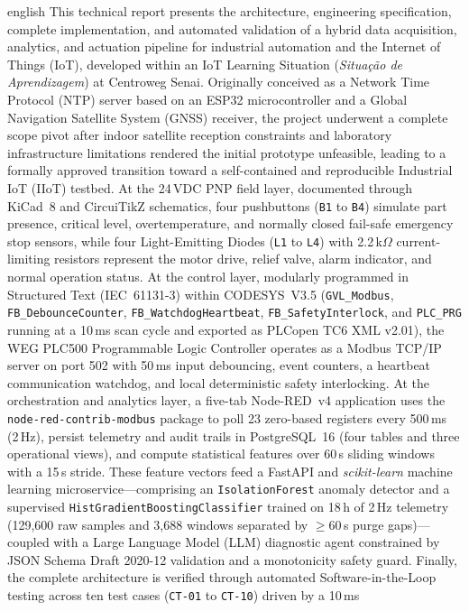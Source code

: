 
\begin{resumo}[Abstract]
\begin{otherlanguage*}{english}
This technical report presents the architecture, engineering specification, complete implementation, and automated validation of a hybrid data acquisition, analytics, and actuation pipeline for industrial automation and the Internet of Things (IoT), developed within an IoT Learning Situation (\textit{Situação de Aprendizagem}) at Centroweg Senai. Originally conceived as a Network Time Protocol (NTP) server based on an ESP32 microcontroller and a Global Navigation Satellite System (GNSS) receiver, the project underwent a complete scope pivot after indoor satellite reception constraints and laboratory infrastructure limitations rendered the initial prototype unfeasible, leading to a formally approved transition toward a self-contained and reproducible Industrial IoT (IIoT) testbed. At the 24\,VDC PNP field layer, documented through KiCad~8 and CircuiTikZ schematics, four pushbuttons (\texttt{B1} to \texttt{B4}) simulate part presence, critical level, overtemperature, and normally closed fail-safe emergency stop sensors, while four Light-Emitting Diodes (\texttt{L1} to \texttt{L4}) with 2.2\,k$\Omega$ current-limiting resistors represent the motor drive, relief valve, alarm indicator, and normal operation status. At the control layer, modularly programmed in Structured Text (IEC~61131-3) within CODESYS~V3.5 (\texttt{GVL\_Modbus}, \texttt{FB\_\allowbreak Debounce\allowbreak Counter}, \texttt{FB\_\allowbreak Watchdog\allowbreak Heartbeat}, \texttt{FB\_\allowbreak Safety\allowbreak Interlock}, and \texttt{PLC\_PRG} running at a 10\,ms scan cycle and exported as PLCopen TC6 XML v2.01), the WEG PLC500 Programmable Logic Controller operates as a Modbus TCP/IP server on port 502 with 50\,ms input debouncing, event counters, a heartbeat communication watchdog, and local deterministic safety interlocking. At the orchestration and analytics layer, a five-tab Node-RED~v4 application uses the \texttt{node-red-\allowbreak contrib-\allowbreak modbus} package to poll 23 zero-based registers every 500\,ms (2\,Hz), persist telemetry and audit trails in PostgreSQL~16 (four tables and three operational views), and compute statistical features over 60\,s sliding windows with a 15\,s stride. These feature vectors feed a FastAPI and \textit{scikit-learn} machine learning microservice---comprising an \texttt{Isolation\allowbreak Forest} anomaly detector and a supervised \texttt{HistGradient\allowbreak Boosting\allowbreak Classifier} trained on 18\,h of 2\,Hz telemetry (129,600 raw samples and 3,688 windows separated by $\ge 60$\,s purge gaps)---coupled with a Large Language Model (LLM) diagnostic agent constrained by JSON Schema Draft 2020-12 validation and a monotonicity safety guard. Finally, the complete architecture is verified through automated Software-in-the-Loop testing across ten test cases (\texttt{CT-01} to \texttt{CT-10}) driven by a 10\,ms 
\end{otherlanguage*}
\end{resumo}
